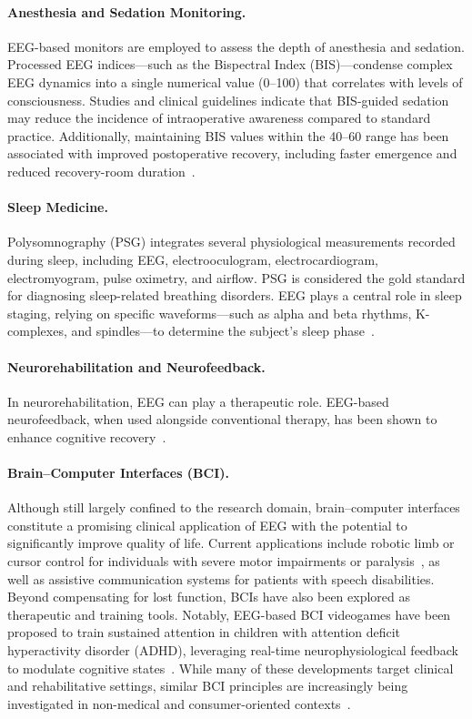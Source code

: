 \paragraph*{Anesthesia and Sedation Monitoring.}
EEG-based monitors are employed to assess the depth of anesthesia and sedation. Processed EEG indices—such as the Bispectral Index (BIS)—condense complex EEG dynamics into a single numerical value (0–100) that correlates with levels of consciousness. Studies and clinical guidelines indicate that BIS-guided sedation may reduce the incidence of intraoperative awareness compared to standard practice. Additionally, maintaining BIS values within the 40–60 range has been associated with improved postoperative recovery, including faster emergence and reduced recovery-room duration~\cite{mathur-2023}.


\paragraph*{Sleep Medicine.}  Polysomnography (PSG) integrates several physiological measurements recorded during sleep, including EEG, electrooculogram, electrocardiogram, electromyogram, pulse oximetry, and airflow. PSG is considered the gold standard for diagnosing sleep-related breathing disorders. EEG plays a central role in sleep staging, relying on specific waveforms—such as alpha and beta rhythms, K-complexes, and spindles—to determine the subject’s sleep phase~\cite{gerstenslager-2023,rundo-2019}.


\paragraph*{Neurorehabilitation and Neurofeedback.} In neurorehabilitation, EEG can play a therapeutic role. EEG-based neurofeedback, when used alongside conventional therapy, has been shown to enhance cognitive recovery~\cite{arroyo-ferrer-2021}.


\paragraph*{Brain–Computer Interfaces (BCI).} 
Although still largely confined to the research domain, brain–computer interfaces constitute a promising clinical application of EEG with the potential to significantly improve quality of life. Current applications include robotic limb or cursor control for individuals with severe motor impairments or paralysis~\cite{ding-2025}, as well as assistive communication systems for patients with speech disabilities. Beyond compensating for lost function, BCIs have also been explored as therapeutic and training tools. Notably, EEG-based BCI videogames have been proposed to train sustained attention in children with attention deficit hyperactivity disorder (ADHD), leveraging real-time neurophysiological feedback to modulate cognitive states~\cite{munoz-2015}. While many of these developments target clinical and rehabilitative settings, similar BCI principles are increasingly being investigated in non-medical and consumer-oriented contexts~\cite{varbu-2022}.